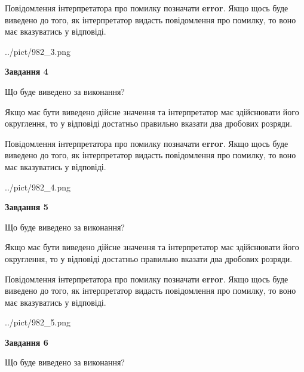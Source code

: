 \documentclass[12pt, ukrainian]{article}
\begin{document}
{\begin {Large}
Повідомлення інтерпретатора про помилку позначати \textbf{error}.
Якщо щось буде виведено до того, як інтерпретатор видасть повідомлення про помилку, 
то воно має вказуватись у відповіді. \par

\begin{center}
	{../pict/982_3.png}
\end{center}
\newpage

{\begin {center}\textbf{Завдання 4}\end {center}}\par
Що буде виведено за виконання? \par

Якщо має бути виведено дійсне значення та інтерпретатор має здійснювати його округлення, 
то у відповіді достатньо правильно вказати два дробових розряди.

Повідомлення інтерпретатора про помилку позначати \textbf{error}.
Якщо щось буде виведено до того, як інтерпретатор видасть повідомлення про помилку, 
то воно має вказуватись у відповіді. \par

\begin{center}
	{../pict/982_4.png}
\end{center}
\newpage

{\begin {center}\textbf{Завдання 5}\end {center}}\par
Що буде виведено за виконання? \par

Якщо має бути виведено дійсне значення та інтерпретатор має здійснювати його округлення, 
то у відповіді достатньо правильно вказати два дробових розряди.

Повідомлення інтерпретатора про помилку позначати \textbf{error}.
Якщо щось буде виведено до того, як інтерпретатор видасть повідомлення про помилку, 
то воно має вказуватись у відповіді. \par

\begin{center}
	{../pict/982_5.png}
\end{center}
\newpage

{\begin {center}\textbf{Завдання 6}\end {center}}\par
Що буде виведено за виконання? \par


\end{Large}}
\end{document}

